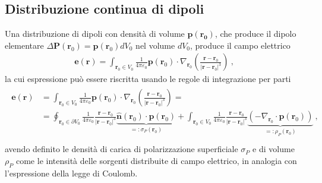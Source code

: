 \documentclass[letterpaper,10pt,italian]{jupyterBook}
\begin{document}
\subsection{Distribuzione continua di dipoli}
\label{\detokenize{ch/media:distribuzione-continua-di-dipoli}}
\sphinxAtStartPar
Una distribuzione di dipoli con densità di volume \(\mathbf{p}(\mathbf{r_0})\), che produce il dipolo elementare \(\Delta \mathbf{P}(\mathbf{r}_0) = \mathbf{p}(\mathbf{r}_0) dV_0\) nel volume \(d V_0\), produce il campo elettrico
\begin{equation*}
\begin{split}\mathbf{e}(\mathbf{r}) = \int_{\mathbf{r}_0 \in V_0} \frac{1}{4 \pi \varepsilon_0} \mathbf{p}(\mathbf{r}_0) \cdot \nabla_{\mathbf{r}_0}  \left( \frac{\mathbf{r} - \mathbf{r}_0}{|\mathbf{r} - \mathbf{r}_0|^3} \right) \ , \end{split}
\end{equation*}
\sphinxAtStartPar
la cui espressione può essere riscritta usando le regole di integrazione per parti
\begin{equation*}
\begin{split}\begin{aligned}
\mathbf{e}(\mathbf{r})
  & = \int_{\mathbf{r}_0 \in V_0} \frac{1}{4 \pi \varepsilon_0} \mathbf{p}(\mathbf{r}_0) \cdot \nabla_{\mathbf{r}_0}  \left( \frac{\mathbf{r} - \mathbf{r}_0}{|\mathbf{r} - \mathbf{r}_0|^3} \right) = \\
  & = \oint_{\mathbf{r}_0 \in \partial V_0} \frac{1}{4 \pi \varepsilon_0}  \frac{\mathbf{r} - \mathbf{r}_0}{|\mathbf{r} - \mathbf{r}_0|^3} \underbrace{ \hat{\mathbf{n}}(\mathbf{r}_0) \cdot \mathbf{p}(\mathbf{r}_0) }_{ =: \sigma_P(\mathbf{r}_0)}  + \int_{\mathbf{r}_0 \in V_0} \frac{1}{4 \pi \varepsilon_0} \frac{\mathbf{r} - \mathbf{r}_0}{|\mathbf{r} - \mathbf{r}_0|^3} \underbrace{ \left( - \nabla_{\mathbf{r}_0} \cdot \mathbf{p}(\mathbf{r}_0) \right)}_{ =: \rho_P(\mathbf{r}_0) } \ , \\
\end{aligned}\end{split}
\end{equation*}
\sphinxAtStartPar
avendo definito le densità di carica di polarizzazione superficiale \(\sigma_P\) e di volume \(\rho_P\) come le intensità delle sorgenti distribuite di campo elettrico, in analogia con l’espressione della legge di Coulomb.
\end{document}
